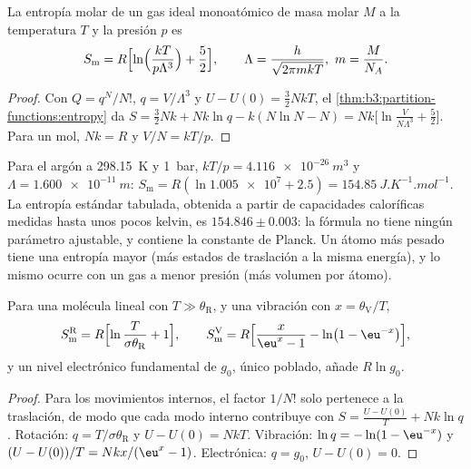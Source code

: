 \begin{theorem}\label{thm:b3:partition-functions:sackur-tetrode}
La entropía molar de un gas ideal monoatómico de masa molar $M$ a la temperatura $T$
y la presión $p$ es
\[
  S_{\mathrm m} = R\Bigl[\ln\Bigl(\frac{kT}{p\Lambda^3}\Bigr) + \frac52\Bigr],
  \qquad \Lambda = \frac{h}{\sqrt{2\pi mkT}},\ m = \frac{M}{N_A}.
\]
\end{theorem}

\begin{proof}
Con $Q = q^N/N!$, $q = V/\Lambda^3$ y $U - U(0) = \frac32NkT$, el
\cref{thm:b3:partition-functions:entropy} da $S = \frac32Nk + Nk\ln q - k(N\ln N - N) =
Nk\bigl[\ln\frac{V}{N\Lambda^3} + \frac52\bigr]$. Para un mol, $Nk = R$ y $V/N = kT/p$.
\end{proof}

Para el argón a \qty{298.15}{K} y \qty{1}{bar}, $kT/p = \qty{4.116e-26}{m^3}$ y $\Lambda =
\qty{1.600e-11}{m}$: $S_{\mathrm m} = R(\ln\num{1.005e7} + 2.5) = \qty{154.85}{J.K^{-1}.mol^{-1}}$. La
entropía estándar tabulada, obtenida a partir de capacidades caloríficas medidas hasta unos
pocos kelvin, es $154.846 \pm 0.003$: la fórmula no tiene ningún parámetro ajustable, y
contiene la constante de Planck. Un átomo más pesado tiene una entropía mayor (más
estados de traslación a la misma energía), y lo mismo ocurre con un gas a menor presión
(más volumen por átomo).

\begin{proposition}\label{prop:b3:partition-functions:modes-entropy}
Para una molécula lineal con $T \gg \theta_{\mathrm R}$, y una vibración con $x = \theta_{\mathrm V}/T$,
\[
  S^{\mathrm R}_{\mathrm m} = R\Bigl[\ln\frac{T}{\sigma\theta_{\mathrm R}} + 1\Bigr],
  \qquad
  S^{\mathrm V}_{\mathrm m} = R\Bigl[\frac{x}{\eu^x - 1} - \ln\bigl(1 - \eu^{-x}\bigr)\Bigr],
\]
y un nivel electrónico fundamental de  $g_0$, único poblado, añade $R\ln g_0$.
\end{proposition}

\begin{proof}
Para los movimientos internos, el factor $1/N!$ solo pertenece a la traslación, de modo que cada
modo interno contribuye con $S = \frac{U - U(0)}{T} + Nk\ln q$. Rotación:
$q = T/\sigma\theta_{\mathrm R}$ y $U - U(0) = NkT$. Vibración: $\ln q = -\ln(1 - \eu^{-x})$ y
$(U - U(0))/T = Nkx/(\eu^x - 1)$. Electrónica: $q = g_0$, $U - U(0) = 0$.
\end{proof}

